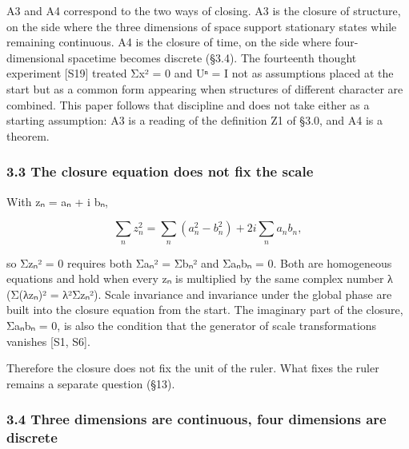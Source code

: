 \documentclass[
  a4paper,
]{article}
\begin{document}
A3 and A4 correspond to the two ways of closing. A3 is the closure of
structure, on the side where the three dimensions of space support
stationary states while remaining continuous. A4 is the closure of time,
on the side where four-dimensional spacetime becomes discrete (§3.4).
The fourteenth thought experiment {[}S19{]} treated Σx² = 0 and Uⁿ = I
not as assumptions placed at the start but as a common form appearing
when structures of different character are combined. This paper follows
that discipline and does not take either as a starting assumption: A3 is
a reading of the definition Z1 of §3.0, and A4 is a theorem.

\subsubsection{3.3 The closure equation does not fix the
scale}\label{the-closure-equation-does-not-fix-the-scale}

With zₙ = aₙ + i bₙ,

\[
\sum_n z_n^2=\sum_n(a_n^2-b_n^2)+2i\sum_n a_nb_n ,
\]

so Σzₙ² = 0 requires both Σaₙ² = Σbₙ² and Σaₙbₙ = 0. Both are
homogeneous equations and hold when every zₙ is multiplied by the same
complex number λ (Σ(λzₙ)² = λ²Σzₙ²). Scale invariance and invariance
under the global phase are built into the closure equation from the
start. The imaginary part of the closure, Σaₙbₙ = 0, is also the
condition that the generator of scale transformations vanishes {[}S1,
S6{]}.

Therefore the closure does not fix the unit of the ruler. What fixes the
ruler remains a separate question (§13).

\subsubsection{3.4 Three dimensions are continuous, four dimensions are
discrete}\label{three-dimensions-are-continuous-four-dimensions-are-discrete}
\end{document}
